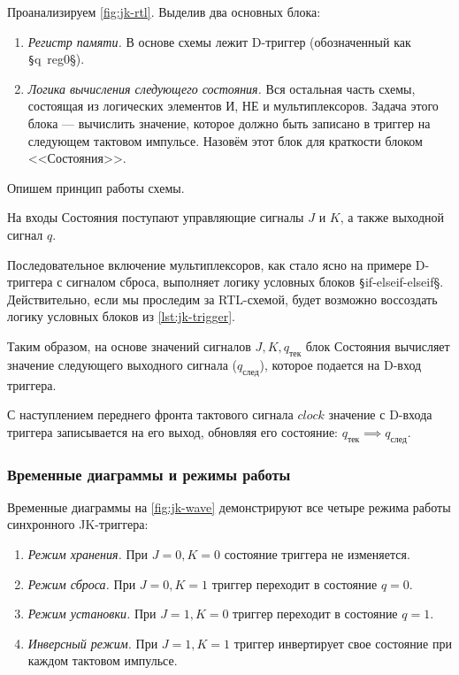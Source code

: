 Проанализируем \cref{fig:jk-rtl}. Выделив два основных блока:
\begin{enumerate}
    \item \textit{Регистр памяти.} В основе схемы лежит D-триггер (обозначенный как \texttt§q~reg0§). 

    \item \textit{Логика вычисления следующего состояния.} Вся остальная часть схемы, состоящая из логических элементов И, НЕ и мультиплексоров. Задача этого блока --- вычислить значение, которое должно быть записано в триггер на следующем тактовом импульсе. Назовём этот блок для краткости блоком <<Состояния>>.
\end{enumerate}

Опишем принцип работы схемы.

На входы Состояния поступают управляющие сигналы $J$ и $K$, а также выходной сигнал $q$.

Последовательное включение мультиплексоров, как стало ясно на примере D-триггера с сигналом сброса, выполняет логику условных блоков \texttt§if-elseif-elseif§. Действительно, если мы проследим за RTL-схемой, будет возможно воссоздать логику условных блоков из \cref{lst:jk-trigger}.

Таким образом, на основе значений сигналов $J, K, q_\text{тек}$ блок Состояния вычисляет значение следующего выходного сигнала ($q_\text{след}$), которое подается на D-вход триггера.

С наступлением переднего фронта тактового сигнала $clock$ значение с D-входа триггера записывается на его выход, обновляя его состояние: $q_\text{тек} \implies q_\text{след}$.


\subsubsection*{Временные диаграммы и режимы работы}
Временные диаграммы на \cref{fig:jk-wave} демонстрируют все четыре режима работы синхронного JK-триггера:
\begin{enumerate}
    \item \textit{Режим хранения.} При $J=0, K=0$ состояние триггера не изменяется.
    \item \textit{Режим сброса.} При $J=0, K=1$ триггер переходит в состояние $q=0$.
    \item \textit{Режим установки.} При $J=1, K=0$ триггер переходит в состояние $q=1$.
    \item \textit{Инверсный режим.} При $J=1, K=1$ триггер инвертирует свое состояние при каждом тактовом импульсе.
\end{enumerate}

